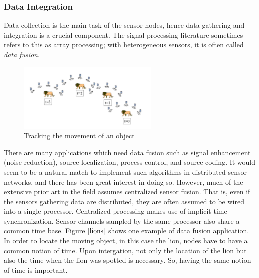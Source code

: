\documentclass[a4paper,10pt]{report}
\begin{document}
\subsubsection{Data Integration}
Data collection is the main task of the sensor nodes, hence data gathering and integration is a crucial component. The signal processing literature sometimes refers to this as array processing; with heterogeneous sensors, it is often called \textit{data fusion}.
\begin{figure}
\centering
\includegraphics[width= 0.6\textwidth]{lions}
\caption{Tracking the movement of an object}
\label{lions}
\end{figure}
\newline
There are many applications which need data fusion such as signal enhancement (noise reduction), source localization, process control, and source coding. It would seem to be a natural match to implement such algorithms in distributed sensor networks, and there has been great interest in doing so. However, much of the extensive prior art in the field assumes centralized sensor fusion. That is, even if the sensors
gathering data are distributed, they are often assumed to be wired into a single processor. Centralized processing makes use of
implicit time synchronization. Sensor channels sampled by the same processor also share a common time base. Figure $\ref{lions}$ shows 
one example of data fusion application. In order to locate the moving object, in this case the lion, nodes have to have a common
notion of time. Upon intergation, not only the location of the lion but also the time when the lion was spotted is necessary. So, having the same notion of time is important.
\end{document}
